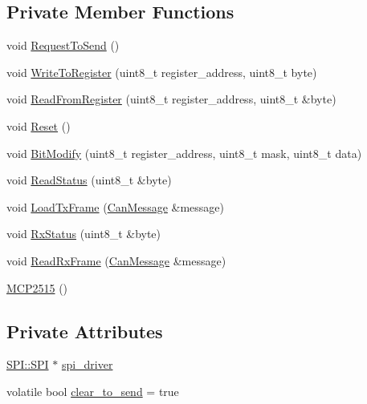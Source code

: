 \subsection*{Private Member Functions}
\begin{DoxyCompactItemize}
\item 
void \hyperlink{class_m_c_p2515_a5a218199ca1dfcb25cb95890bc0220fc}{Request\+To\+Send} ()
\item 
void \hyperlink{class_m_c_p2515_adbc005a5975b77b0aef74363f3832f9b}{Write\+To\+Register} (uint8\+\_\+t register\+\_\+address, uint8\+\_\+t byte)
\item 
void \hyperlink{class_m_c_p2515_a09ef6973daccbf868d89986e727cfa1b}{Read\+From\+Register} (uint8\+\_\+t register\+\_\+address, uint8\+\_\+t \&byte)
\item 
void \hyperlink{class_m_c_p2515_aa4d4138b984dc87116cf72ae104acb70}{Reset} ()
\item 
void \hyperlink{class_m_c_p2515_aa9a35fe139adf1fccaaceec561544c14}{Bit\+Modify} (uint8\+\_\+t register\+\_\+address, uint8\+\_\+t mask, uint8\+\_\+t data)
\item 
void \hyperlink{class_m_c_p2515_ae466f10eea5ccf0f36439757d4baf6b5}{Read\+Status} (uint8\+\_\+t \&byte)
\item 
void \hyperlink{class_m_c_p2515_a98ab4323b49fc629871584ce8f22a617}{Load\+Tx\+Frame} (\hyperlink{struct_can_message}{Can\+Message} \&message)
\item 
void \hyperlink{class_m_c_p2515_af6853f82074a0be19d5a0516a959515e}{Rx\+Status} (uint8\+\_\+t \&byte)
\item 
void \hyperlink{class_m_c_p2515_ae9c114f9fd7248d78fe5617648f7571b}{Read\+Rx\+Frame} (\hyperlink{struct_can_message}{Can\+Message} \&message)
\item 
\hyperlink{class_m_c_p2515_aa30177fa790741310b4453a62f8d724b}{M\+C\+P2515} ()
\end{DoxyCompactItemize}
\subsection*{Private Attributes}
\begin{DoxyCompactItemize}
\item 
\hyperlink{class_s_p_i_1_1_s_p_i}{S\+P\+I\+::\+S\+PI} $\ast$ \hyperlink{class_m_c_p2515_a7c70cb397f4d2881a1878e40b9278ad0}{spi\+\_\+driver}
\item 
volatile bool \hyperlink{class_m_c_p2515_a1418f0f66d9a57659809192552d5ac37}{clear\+\_\+to\+\_\+send} = true
\end{DoxyCompactItemize}

